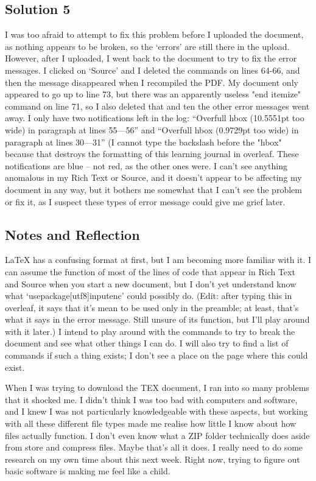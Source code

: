 \documentclass{article}
\begin{document}
\subsection{Solution 5}
I was too afraid to attempt to fix this problem before I uploaded the document, as nothing appears to be broken, so the ‘errors’ are still there in the upload. However, after I uploaded, I went back to the document to try to fix the error messages. I clicked on ‘Source’ and I deleted the commands on lines 64-66, and then the message disappeared when I recompiled the PDF. My document only appeared to go up to line 73, but there was an apparently useless "end itemize" command on line 71, so I also deleted that and ten the other error messages went away. I only have two notifications left in the log: “Overfull hbox (10.5551pt too wide) in paragraph at lines 55—56” and “Overfull hbox (0.9729pt too wide) in paragraph at lines 30—31” (I cannot type the backslash before the "hbox" because that destroys the formatting of this learning journal in overleaf. These notifications are blue – not red, as the other ones were. I can’t see anything anomalous in my Rich Text or Source, and it doesn’t appear to be affecting my document in any way, but it bothers me somewhat that I can’t see the problem or fix it, as I suspect these types of error message could give me grief later.

\subsection{Notes and Reflection}
LaTeX has a confusing format at first, but I am becoming more familiar with it. I can assume the function of most of the lines of code that appear in Rich Text and Source when you start a new document, but I don’t yet understand know what ‘usepackage[utf8]{inputenc}’ could possibly do. (Edit: after typing this in overleaf, it says that it's mean to be used only in the preamble; at least, that's what it says in the error message. Still unsure of its function, but I'll play around with it later.) I intend to play around with the commands to try to break the document and see what other things I can do. I will also try to find a list of commands if such a thing exists; I don’t see a place on the page where this could exist.

When I was trying to download the TEX document, I ran into so many problems that it shocked me. I didn’t think I was too bad with computers and software, and I knew I was not particularly knowledgeable with these aspects, but working with all these different file types made me realise how little I know about how files actually function. I don’t even know what a ZIP folder technically does aside from store and compress files. Maybe that’s all it does. I really need to do some research on my own time about this next week. Right now, trying to figure out basic software is making me feel like a child.
\end{document}
